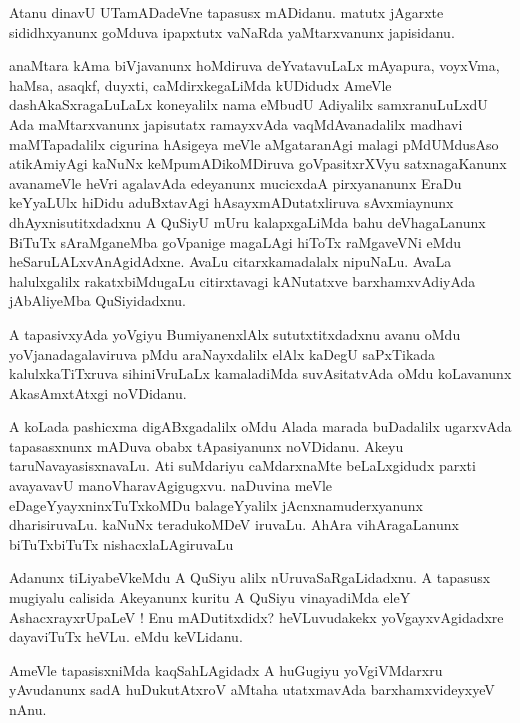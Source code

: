 \documentclass{article}
\begin{document}
\begin{mn}%
Atanu dinavU UTamADadeVne tapasusx mADidanu. matutx jAgarxte sididhxyanunx goMduva 
ipapxtutx vaNaRda yaMtarxvanunx japisidanu.
\end{mn}

\begin{mn}%
anaMtara kAma biVjavanunx hoMdiruva deYvatavuLaLx mAyapura, voyxVma, haMsa, asaqkf, duyxti,
caMdirxkegaLiMda kUDidudx AmeVle dashAkaSxragaLuLaLx koneyalilx nama eMbudU Adiyalilx 
samxranuLuLxdU Ada maMtarxvanunx japisutatx ramayxvAda vaqMdAvanadalilx madhavi 
maMTapadalilx cigurina hAsigeya meVle aMgataranAgi malagi pMdUMdusAso atikAmiyAgi kaNuNx 
keMpumADikoMDiruva goVpasitxrXVyu satxnagaKanunx avanameVle heVri agalavAda edeyanunx 
mucicxdaA pirxyananunx EraDu keYyaLUlx hiDidu aduBxtavAgi hAsayxmADutatxliruva 
sAvxmiaynunx dhAyxnisutitxdadxnu A QuSiyU mUru kalapxgaLiMda bahu deVhagaLanunx BiTuTx 
sAraMganeMba  goVpanige magaLAgi  hiToTx raMgaveVNi eMdu heSaruLALxvAnAgidAdxne. AvaLu 
citarxkamadalalx nipuNaLu. AvaLa halulxgalilx rakatxbiMdugaLu citirxtavagi kANutatxve 
barxhamxvAdiyAda jAbAliyeMba QuSiyidadxnu.
\end{mn}

\begin{mn}%
A tapasivxyAda yoVgiyu BumiyanenxlAlx sututxtitxdadxnu avanu oMdu yoVjanadagalaviruva pMdu 
araNayxdalilx elAlx kaDegU saPxTikada kalulxkaTiTxruva sihiniVruLaLx kamaladiMda 
suvAsitatvAda oMdu koLavanunx AkasAmxtAtxgi noVDidanu.
\end{mn}

\begin{mn}%
A koLada pashicxma digABxgadalilx oMdu Alada marada buDadalilx ugarxvAda tapasasxnunx 
mADuva obabx tApasiyanunx noVDidanu. Akeyu taruNavayasisxnavaLu. Ati suMdariyu 
caMdarxnaMte beLaLxgidudx parxti avayavavU manoVharavAgigugxvu. naDuvina meVle 
eDageYyayxninxTuTxkoMDu balageYyalilx jAcnxnamuderxyanunx dharisiruvaLu. kaNuNx 
teradukoMDeV iruvaLu. AhAra vihAragaLanunx biTuTxbiTuTx nishacxlaLAgiruvaLu
\end{mn}

\begin{mn}%
Adanunx tiLiyabeVkeMdu A QuSiyu alilx nUruvaSaRgaLidadxnu. A tapasusx mugiyalu calisida 
Akeyanunx kuritu A QuSiyu vinayadiMda eleY AshacxrayxrUpaLeV ! Enu mADutitxdidx? 
heVLuvudakekx yoVgayxvAgidadxre dayaviTuTx heVLu. eMdu keVLidanu.
\end{mn}

\begin{mn}%
AmeVle tapasisxniMda kaqSahLAgidadx A huGugiyu yoVgiVMdarxru yAvudanunx sadA huDukutAtxroV 
aMtaha utatxmavAda barxhamxvideyxyeV nAnu.
\end{mn}
\end{document}
